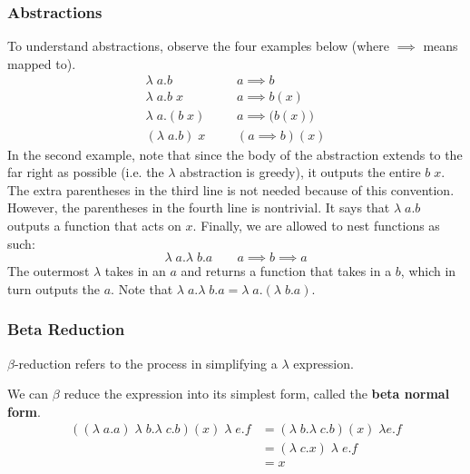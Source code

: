   \subsubsection{Abstractions}
  To understand abstractions, observe the four examples below (where $\implies$ means mapped to). 
  \begin{align*}
      \lambda \;a.b & \;\;\;\;\;\;a \implies b \\
      \lambda \;a.b\;x & \;\;\;\;\;\;a \implies b(x) \\
      \lambda \;a.(b\;x) & \;\;\;\;\;\;a \implies \big( b(x) \big) \\
      (\lambda \;a.b)\; x & \;\;\;\;\;\;(a \implies b) (x)
  \end{align*}
  In the second example, note that since the body of the abstraction extends to the far right as possible (i.e. the $\lambda$ abstraction is greedy), it outputs the entire $b\;x$. The extra parentheses in the third line is not needed because of this convention. However, the parentheses in the fourth line is nontrivial. It says that $\lambda\;a.b$ outputs a function that acts on $x$. Finally, we are allowed to nest functions as such:
  \begin{equation}
    \lambda\;a.\lambda\;b.a  \;\;\;\;\;\;\; a \implies b \implies a
  \end{equation}
  The outermost $\lambda$ takes in an $a$ and returns a function that takes in a $b$, which in turn outputs the $a$. Note that $\lambda\;a.\lambda\;b.a = \lambda\;a.(\lambda\;b.a)$. 


  \subsubsection{Beta Reduction}
  $\beta$-reduction refers to the process in simplifying a $\lambda$ expression. 

  \begin{example}
    \label{ex:beta-normal-form}
  We can $\beta$ reduce the expression into its simplest form, called the \textbf{beta normal form}. 
  \begin{align*}
      ((\lambda\;a.a)\;\lambda\;b.\lambda\;c.b)(x) \;\lambda\;e.f  & = (\lambda\;b.\lambda\;c.b) (x) \;\lambda e.f \\
      & = (\lambda\;c.x) \; \lambda \;e.f \\
      & = x 
  \end{align*}
  \end{example}

